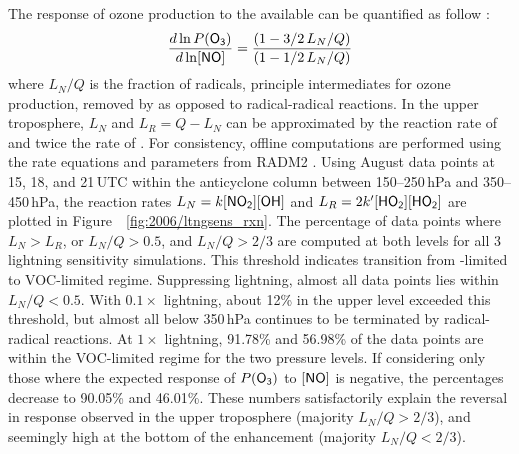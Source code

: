 The response of ozone production to the available  can be quantified as follow \citep{Kleinman:2001fk}:
\begin{equation}\label{eqn:k01NO}
	\frac{d\ln P(\chem{O_3})}{d\ln[\chem{NO}]} = \frac{(1-3/2\,L_N/Q)}{(1-1/2\,L_N/Q)}
\end{equation}
where $L_N/Q$ is the fraction of  radicals, principle intermediates for ozone production, removed by
 as opposed to radical-radical reactions. In the upper troposphere, $L_N$ and $L_R=Q-L_N$ can be
approximated by the reaction rate of  and twice the rate of . For consistency,
offline computations are performed using the rate equations and parameters from RADM2
\citep[][and references therein]{Stockwell:1990ez}. Using August data points at 15, 18, and 21\,\unit{UTC} within
the anticyclone column between 150--250\,\unit{hPa} and 350--450\,\unit{hPa}, the reaction rates
$L_N=k\chem{[NO_2][OH]}$ and $L_R=2k'\chem{[HO_2][HO_2]}$ are plotted in Figure~~\ref{fig:2006/ltngsens_rxn}.
The percentage of data points where $L_N>L_R$, or $L_N/Q > 0.5$, and $L_N/Q>2/3$ are computed at both
levels for all 3 lightning sensitivity simulations. This threshold indicates transition from -limited to
VOC-limited regime. Suppressing lightning, almost all data points lies within $L_N/Q<0.5$. With $0.1\times$
lightning, about 12\% in the upper level exceeded this threshold, but almost all  below 350\,\unit{hPa}
continues to be terminated by radical-radical reactions. At $1\times$ lightning, 91.78\% and 56.98\% of the data
points are within the VOC-limited regime for the two pressure levels. If considering only those where the expected response of $P(\chem{O_3})$
to $[\chem{NO}]$ is negative, the percentages decrease to 90.05\% and 46.01\%. These numbers satisfactorily
explain the reversal in response observed in the upper troposphere (majority $L_N/Q>2/3$), and seemingly high
at the bottom of the enhancement (majority $L_N/Q<2/3$).


